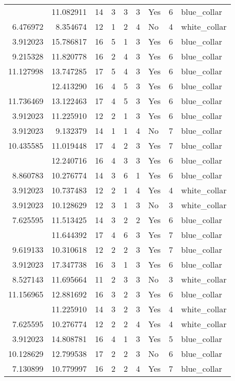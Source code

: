 \documentclass[
]{article}
\begin{document}
\begin{longtable}[t]{rrrrrllrl}
\addlinespace
4.605170 & 11.082911 & 14 & 3 & 3 & 3 & Yes & 6 & blue\_collar\\
6.476972 & 8.354674 & 12 & 1 & 2 & 4 & No & 4 & white\_collar\\
3.912023 & 15.786817 & 16 & 5 & 1 & 3 & Yes & 6 & blue\_collar\\
9.215328 & 11.820778 & 16 & 2 & 4 & 3 & Yes & 6 & blue\_collar\\
11.127998 & 13.747285 & 17 & 5 & 4 & 3 & Yes & 6 & blue\_collar\\
\addlinespace
10.167773 & 12.413290 & 16 & 4 & 5 & 3 & Yes & 6 & blue\_collar\\
11.736469 & 13.122463 & 17 & 4 & 5 & 3 & Yes & 6 & blue\_collar\\
3.912023 & 11.225910 & 12 & 2 & 1 & 3 & Yes & 6 & blue\_collar\\
3.912023 & 9.132379 & 14 & 1 & 1 & 4 & No & 7 & blue\_collar\\
10.435585 & 11.019448 & 17 & 4 & 2 & 3 & Yes & 7 & blue\_collar\\
\addlinespace
6.309918 & 12.240716 & 16 & 4 & 3 & 3 & Yes & 6 & blue\_collar\\
8.860783 & 10.276774 & 14 & 3 & 6 & 1 & Yes & 6 & blue\_collar\\
3.912023 & 10.737483 & 12 & 2 & 1 & 4 & Yes & 4 & white\_collar\\
3.912023 & 10.128629 & 12 & 3 & 1 & 3 & No & 3 & white\_collar\\
7.625595 & 11.513425 & 14 & 3 & 2 & 2 & Yes & 6 & blue\_collar\\
\addlinespace
8.968269 & 11.644392 & 17 & 4 & 6 & 3 & Yes & 7 & blue\_collar\\
9.619133 & 10.310618 & 12 & 2 & 2 & 3 & Yes & 7 & blue\_collar\\
3.912023 & 17.347738 & 16 & 3 & 1 & 3 & Yes & 6 & blue\_collar\\
8.527143 & 11.695664 & 11 & 2 & 3 & 3 & No & 3 & white\_collar\\
11.156965 & 12.881692 & 16 & 3 & 2 & 3 & Yes & 6 & blue\_collar\\
\addlinespace
7.346010 & 11.225910 & 14 & 3 & 2 & 3 & Yes & 4 & white\_collar\\
7.625595 & 10.276774 & 12 & 2 & 2 & 4 & Yes & 4 & white\_collar\\
3.912023 & 14.808781 & 16 & 4 & 1 & 3 & Yes & 5 & blue\_collar\\
10.128629 & 12.799538 & 17 & 2 & 2 & 3 & No & 6 & blue\_collar\\
7.130899 & 10.779997 & 16 & 2 & 2 & 4 & Yes & 7 & blue\_collar\\

\end{longtable}
\end{document}
